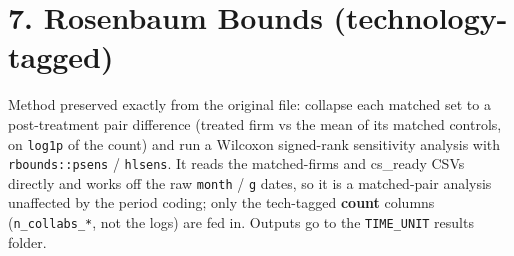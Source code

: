 \documentclass[
]{article}
\begin{document}
\section{7. Rosenbaum Bounds
(technology-tagged)}\label{rosenbaum-bounds-technology-tagged}

Method preserved exactly from the original file: collapse each matched
set to a post-treatment pair difference (treated firm vs the mean of its
matched controls, on \texttt{log1p} of the count) and run a Wilcoxon
signed-rank sensitivity analysis with \texttt{rbounds::psens} /
\texttt{hlsens}. It reads the matched-firms and cs\_ready CSVs directly
and works off the raw \texttt{month} / \texttt{g} dates, so it is a
matched-pair analysis unaffected by the period coding; only the
tech-tagged \textbf{count} columns (\texttt{n\_collabs\_*}, not the
logs) are fed in. Outputs go to the \texttt{TIME\_UNIT} results folder.
\end{document}
